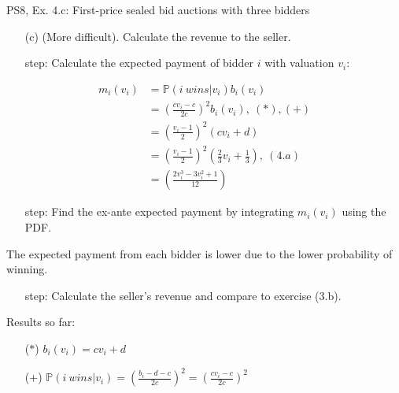 \begin{frame}{PS8, Ex. 4.c: First-price sealed bid auctions with three bidders}
    \begin{itemize}
      \item[(c)] (More difficult). Calculate the revenue to the seller.
    \end{itemize}
    \vspace{-8pt}
    \begin{multicols}{2}
      \begin{itemize}
        \item[\nth{1} step:] Calculate the expected payment of bidder $i$ with valuation $v_i$:
      \end{itemize}
      \vspace{-14pt}
      \begin{align*}
        m_i(v_i)&=\mathbb{P}(i\ wins|v_i)b_i(v_i)\\
                &=\left(\frac{cv_i-c}{2c}\right)^2b_i(v_i),\ (*),(+)\\
                &=\left(\frac{v_i-1}{2}\right)^2(cv_i+d)\\
                &=\left(\frac{v_i-1}{2}\right)^2\left(\frac{2}{3}v_i+\frac{1}{3}\right),\ (4.a)\\
                &=\left(\frac{2v_i^3-3v_i^2+1}{12}\right)
      \end{align*}
      \vspace{-14pt}
      \begin{itemize}
        \item[\nth{2} step:] Find the ex-ante expected payment by integrating $m_i(v_i)$ using the PDF.
      \end{itemize}
      \vspace{-4pt}
      The expected payment from each bidder is lower due to the lower probability of winning.
      \vspace{-4pt}
      \begin{itemize}
        \item[\nth{3} step:] Calculate the seller's revenue and compare to exercise (3.b).
      \end{itemize}
      \vfill\null\columnbreak
      Results so far:
      \vspace{-6pt}
      \begin{itemize}
        \item[($*$)] $b_i(v_i) = cv_i+d$
        \item[($+$)] $\mathbb{P}(i\ wins|v_i)=\left(\frac{b_i-d-c}{2c}\right)^2=\left(\frac{cv_i-c}{2c}\right)^2$

\end{itemize}
\end{multicols}
\end{frame}
